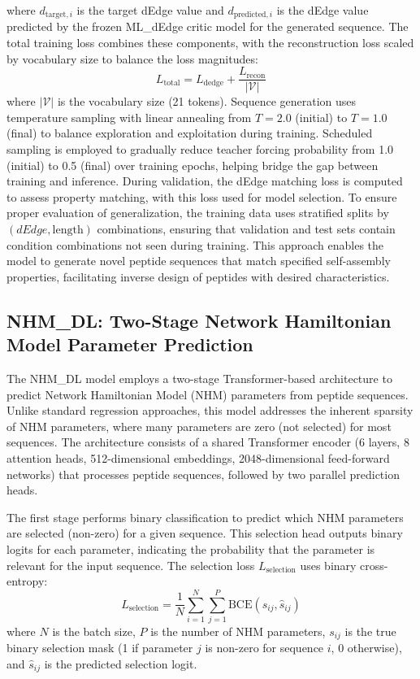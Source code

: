 where $d_{\text{target},i}$ is the target dEdge value and $d_{\text{predicted},i}$ is the dEdge value predicted by the frozen ML\_dEdge critic model for the generated sequence.
The total training loss combines these components, with the reconstruction loss scaled by vocabulary size to balance the loss magnitudes:
\begin{equation}
L_{\text{total}} = L_{\text{dedge}} + \frac{L_{\text{recon}}}{|\mathcal{V}|}
\end{equation}
where $|\mathcal{V}|$ is the vocabulary size (21 tokens).
Sequence generation uses temperature sampling with linear annealing from $T = 2.0$ (initial) to $T = 1.0$ (final) to balance exploration and exploitation during training.
Scheduled sampling is employed to gradually reduce teacher forcing probability from 1.0 (initial) to 0.5 (final) over training epochs, helping bridge the gap between training and inference.
During validation, the dEdge matching loss is computed to assess property matching, with this loss used for model selection.
To ensure proper evaluation of generalization, the training data uses stratified splits by $(dEdge, \text{length})$ combinations, ensuring that validation and test sets contain condition combinations not seen during training.
This approach enables the model to generate novel peptide sequences that match specified self-assembly properties, facilitating inverse design of peptides with desired characteristics.

\subsection{NHM\_DL: Two-Stage Network Hamiltonian Model Parameter Prediction}

The NHM\_DL model employs a two-stage Transformer-based architecture to predict Network Hamiltonian Model (NHM) parameters from peptide sequences.
Unlike standard regression approaches, this model addresses the inherent sparsity of NHM parameters, where many parameters are zero (not selected) for most sequences.
The architecture consists of a shared Transformer encoder (6 layers, 8 attention heads, 512-dimensional embeddings, 2048-dimensional feed-forward networks) that processes peptide sequences, followed by two parallel prediction heads.

The first stage performs binary classification to predict which NHM parameters are selected (non-zero) for a given sequence.
This selection head outputs binary logits for each parameter, indicating the probability that the parameter is relevant for the input sequence.
The selection loss $L_{\text{selection}}$ uses binary cross-entropy:
\begin{equation}
L_{\text{selection}} = \frac{1}{N} \sum_{i=1}^{N} \sum_{j=1}^{P} \text{BCE}(s_{ij}, \hat{s}_{ij})
\end{equation}
where $N$ is the batch size, $P$ is the number of NHM parameters, $s_{ij}$ is the true binary selection mask (1 if parameter $j$ is non-zero for sequence $i$, 0 otherwise), and $\hat{s}_{ij}$ is the predicted selection logit.

